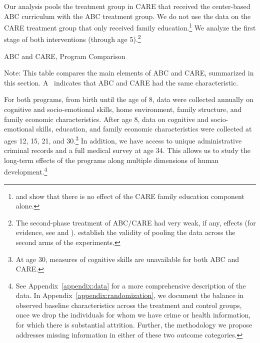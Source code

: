 Our analysis pools the treatment group in CARE that received the center-based ABC curriculum with the ABC treatment group. We do not use the data on the CARE treatment group that only received family education.\footnote{\citet{Campbell_Conti_etal_2014_EarlyChildhoodInvestments} and \citet{ABCCARE_Dataset} show that there is no effect of the CARE family education component alone.} We analyze the first stage of both interventions (through age 5).\footnote{The second-phase treatment of ABC/CARE had very weak, if any, effects (for evidence, see \citealp{Campbell_Conti_etal_2014_EarlyChildhoodInvestments} and \citealp{ABCCARE_Dataset}). \citet{Campbell_Conti_etal_2014_EarlyChildhoodInvestments} establish the validity of pooling the data across the second arms of the experiments.}

\begin{table}[!htbp]
\centering
\caption{ABC and CARE, Program Comparison} \label{tab:programcomparison}
\begin{adjustbox}{max width=\textwidth}
\begin{threeparttable}
	\footnotesize
	
\begin{tablenotes}
\footnotesize
\item Note: This table compares the main elements of ABC and CARE, summarized in this section. A \checkmark\ indicates that ABC and CARE had the same characteristic.
\end{tablenotes}
\end{threeparttable}
\end{adjustbox}
\end{table}

For both programs, from birth until the age of 8, data were collected annually on cognitive and socio-emotional skills, home environment, family structure, and family economic characteristics. After age 8, data on cognitive and socio-emotional skills, education, and family economic characteristics were collected at ages 12, 15, 21, and 30.\footnote{At age 30, measures of cognitive skills are unavailable for both ABC and CARE.} In addition, we have access to unique administrative criminal records and a full medical survey at age 34. This allows us to study the long-term effects of the programs along multiple dimensions of human development.\footnote{See Appendix~\ref{appendix:data} for a more comprehensive description of the data. In Appendix~\ref{appendix:randomization}, we document the balance in observed baseline characteristics across the treatment and control groups, once we drop the individuals for whom we have crime or health information, for which there is substantial attrition. Further, the methodology we propose addresses missing information in either of these two outcome categories.}

